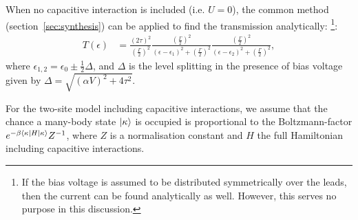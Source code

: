 When no capacitive interaction is included (i.e. $U=0$), the common method (section~\ref{sec:synthesis}) can be applied to find the transmission analytically: \cite{perrinnano}\footnote{If the bias voltage is assumed to be distributed symmetrically over the leads, then the current can be found analytically as well. However, this serves no purpose in this discussion.}:
\begin{align*}
T(\epsilon) &= \frac{ (2\tau)^2 }{(\frac{\Gamma}{2})^2} \frac{(\frac{\Gamma}{2})^2}{(\epsilon-\epsilon_1)^2 + (\frac{\Gamma}{2})^2}\frac{(\frac{\Gamma}{2})^2}{(\epsilon-\epsilon_2)^2 + (\frac{\Gamma}{2})^2},
\end{align*}
where $\epsilon_{1,2} = \epsilon_0 \pm \frac{1}{2} \Delta$, and $\Delta$ is the level splitting in the presence of bias voltage given by $\Delta = \sqrt{ (\alpha V)^2+ 4\tau^2}$. 

For the two-site model including capacitive interactions, we assume that the chance a many-body state $\ket{\kappa}$ is occupied is proportional to the Boltzmann-factor $e^{ -\beta \braket{ \kappa\left| H \right| \kappa}} Z^{-1}$, where $Z$ is a normalisation constant and $H$ the full Hamiltonian including capacitive interactions.

